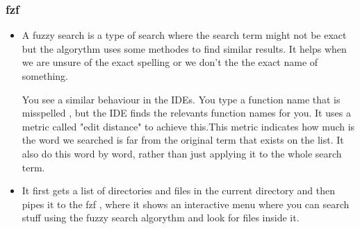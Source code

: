 \documentclass[titlepage]{article}
\begin{document}
\subsubsection{fzf}
\begin{itemize}
\item A fuzzy search is a type of search where the search term might not be exact but the algorythm uses some methodes to find similar results.
  It helps when we are unsure of the exact spelling or we don't the the exact name of something.

    You see a similar behaviour in the IDEs. You type a function name that is misspelled , but the IDE finds the relevants function names for you.
  It uses a metric called "edit distance" to achieve this.This metric indicates how much is the word we searched is far from the original term that exists on the list.
    It also do this word by word, rather than just applying it to the whole search term.
\item It first gets a list of directories and files in the current directory and then pipes it to the fzf , where it shows an interactive menu where you can search stuff using the fuzzy search algorythm and look for files inside it.
   
\end{itemize}






  
\end{document}
